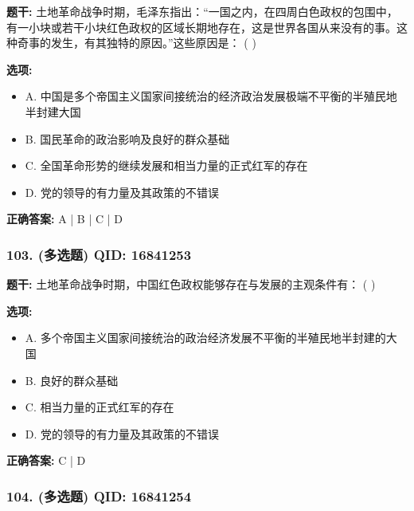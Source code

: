 \documentclass[12pt,UTF8]{ctexart}
\begin{document}
\textbf{题干:}
土地革命战争时期，毛泽东指出：“一国之内，在四周白色政权的包围中，有一小块或若干小块红色政权的区域长期地存在，这是世界各国从来没有的事。这种奇事的发生，有其独特的原因。”这些原因是： ( )

\textbf{选项:}
\begin{itemize}[leftmargin=*]

  \item A. 中国是多个帝国主义国家间接统治的经济政治发展极端不平衡的半殖民地半封建大国

  \item B. 国民革命的政治影响及良好的群众基础

  \item C. 全国革命形势的继续发展和相当力量的正式红军的存在

  \item D. 党的领导的有力量及其政策的不错误

\end{itemize}

\textbf{正确答案:}
A | B | C | D

\vspace{0.3em}\hrulefill\vspace{0.7em}

\subsubsection*{103. (多选题) \small QID: 16841253}

\textbf{题干:}
土地革命战争时期，中国红色政权能够存在与发展的主观条件有： ( )

\textbf{选项:}
\begin{itemize}[leftmargin=*]

  \item A. 多个帝国主义国家间接统治的政治经济发展不平衡的半殖民地半封建的大国

  \item B. 良好的群众基础

  \item C. 相当力量的正式红军的存在

  \item D. 党的领导的有力量及其政策的不错误

\end{itemize}

\textbf{正确答案:}
C | D

\vspace{0.3em}\hrulefill\vspace{0.7em}

\subsubsection*{104. (多选题) \small QID: 16841254}
\end{document}
